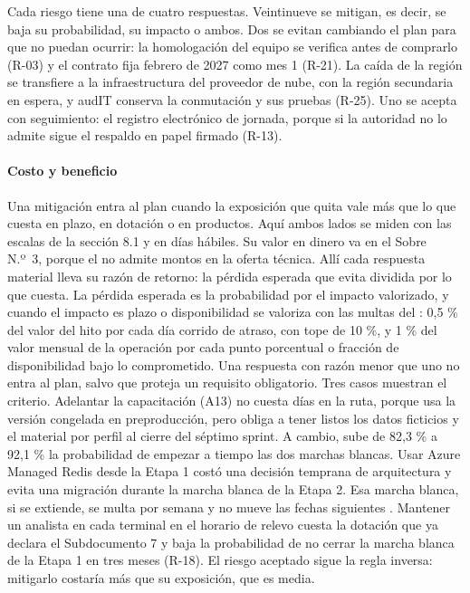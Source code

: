 Cada riesgo tiene una de cuatro respuestas. Veintinueve se mitigan, es decir, se baja su probabilidad,
su impacto o ambos. Dos se evitan cambiando el plan para que no puedan ocurrir: la homologación del
equipo se verifica antes de comprarlo (R-03) y el contrato fija febrero de 2027 como mes 1 (R-21). La
caída de la región se transfiere a la infraestructura del proveedor de nube, con la región secundaria en
espera, y audIT conserva la conmutación y sus pruebas (R-25). Uno se acepta con seguimiento: el registro
electrónico de jornada, porque si la autoridad no lo admite sigue el respaldo en papel firmado (R-13).

\paragraph{Costo y beneficio}
Una mitigación entra al plan cuando la exposición que quita vale más que lo que cuesta en plazo, en
dotación o en productos. Aquí ambos lados se miden con las escalas de la sección 8.1 y en días hábiles.
Su valor en dinero va en el Sobre N.º~3, porque el  no admite montos en la oferta técnica.
Allí cada respuesta material lleva su razón de retorno: la pérdida esperada que evita dividida por lo que
cuesta. La pérdida esperada es la probabilidad por el impacto valorizado, y cuando el impacto es plazo o
disponibilidad se valoriza con las multas del : 0,5 \% del valor del hito por cada día
corrido de atraso, con tope de 10 \%, y 1 \% del valor mensual de la operación por cada punto porcentual
o fracción de disponibilidad bajo lo comprometido. Una respuesta con razón menor que uno no entra al plan, salvo que proteja un
requisito obligatorio. Tres casos muestran el criterio. Adelantar la capacitación (A13) no cuesta días en la ruta, porque usa
la versión congelada en preproducción, pero obliga a tener listos los datos ficticios y el material por
perfil al cierre del séptimo sprint. A cambio, sube de 82,3 \% a 92,1 \% la probabilidad de empezar a
tiempo las dos marchas blancas. Usar Azure Managed Redis desde la Etapa 1 costó una decisión temprana de
arquitectura y evita una migración durante la marcha blanca de la Etapa 2. Esa marcha blanca, si se
extiende, se multa por semana  y no mueve las fechas siguientes . Mantener un
analista en cada terminal en el horario de relevo cuesta la dotación que ya declara el Subdocumento 7 y
baja la probabilidad de no cerrar la marcha blanca de la Etapa 1 en tres meses (R-18). El riesgo
aceptado sigue la regla inversa: mitigarlo costaría más que su exposición, que es media.

